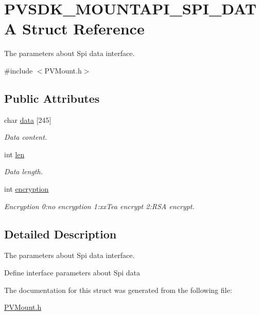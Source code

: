 \hypertarget{struct_p_v_s_d_k___m_o_u_n_t_a_p_i___s_p_i___d_a_t_a}{}\section{P\+V\+S\+D\+K\+\_\+\+M\+O\+U\+N\+T\+A\+P\+I\+\_\+\+S\+P\+I\+\_\+\+D\+A\+TA Struct Reference}
\label{struct_p_v_s_d_k___m_o_u_n_t_a_p_i___s_p_i___d_a_t_a}


The parameters about Spi data interface.  




{\ttfamily \#include $<$P\+V\+Mount.\+h$>$}

\subsection*{Public Attributes}
\begin{DoxyCompactItemize}
\item 
\mbox{\label{struct_p_v_s_d_k___m_o_u_n_t_a_p_i___s_p_i___d_a_t_a_aaa26560d408d7804790b4ff594653f5a}} 
char \hyperlink{struct_p_v_s_d_k___m_o_u_n_t_a_p_i___s_p_i___d_a_t_a_aaa26560d408d7804790b4ff594653f5a}{data} \mbox{[}245\mbox{]}
\begin{DoxyCompactList}\small\item\em Data content. \end{DoxyCompactList}\item 
\mbox{\label{struct_p_v_s_d_k___m_o_u_n_t_a_p_i___s_p_i___d_a_t_a_a77c84315ee6f96ea5454098fcda85e34}} 
int \hyperlink{struct_p_v_s_d_k___m_o_u_n_t_a_p_i___s_p_i___d_a_t_a_a77c84315ee6f96ea5454098fcda85e34}{len}
\begin{DoxyCompactList}\small\item\em Data length. \end{DoxyCompactList}\item 
\mbox{\label{struct_p_v_s_d_k___m_o_u_n_t_a_p_i___s_p_i___d_a_t_a_aace395c53127f591b78a5afb35ffb446}} 
int \hyperlink{struct_p_v_s_d_k___m_o_u_n_t_a_p_i___s_p_i___d_a_t_a_aace395c53127f591b78a5afb35ffb446}{encryption}
\begin{DoxyCompactList}\small\item\em Encryption 0\+:no encryption 1\+:xx\+Tea encrypt 2\+:R\+SA encrypt. \end{DoxyCompactList}\end{DoxyCompactItemize}


\subsection{Detailed Description}
The parameters about Spi data interface. 

Define interface parameters about Spi data 

The documentation for this struct was generated from the following file\+:\begin{DoxyCompactItemize}
\item 
\hyperlink{_p_v_mount_8h}{P\+V\+Mount.\+h}\end{DoxyCompactItemize}
